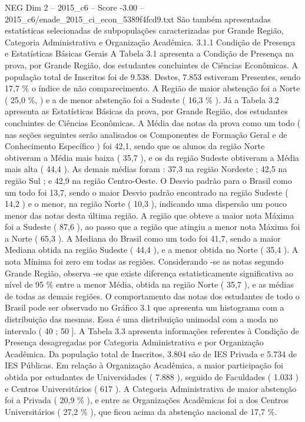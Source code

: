 \begin{textsample}{NEG Dim 2 – 2015\_c6 – Score -3.00 – 2015\_c6/enade\_2015\_ci\_econ\_5389f4fcd9.txt}
São também apresentadas estatísticas selecionadas de subpopulações caracterizadas por Grande Região, Categoria Administrativa e Organização Acadêmica. 3.1.1 Condição de Presença e Estatísticas Básicas Gerais A Tabela 3.1 apresenta a Condição de Presença na prova, por Grande Região, dos estudantes concluintes de Ciências Econômicas.
A população total de Inscritos foi de 9.538.
Destes, 7.853 estiveram Presentes, sendo 17,7 \% o índice de não comparecimento.
A Região de maior abstenção foi a Norte ( 25,0 \%, ) e a de menor abstenção foi a Sudeste ( 16,3 \% ).
Já a Tabela 3.2 apresenta as Estatísticas Básicas da prova, por Grande Região, dos estudantes concluintes de Ciências Econômicas.
A Média das notas da prova como um todo ( nas seções seguintes serão analisados os Componentes de Formação Geral e de Conhecimento Específico ) foi 42,1, sendo que os alunos da região Norte obtiveram a Média mais baixa ( 35,7 ), e os da região Sudeste obtiveram a Média mais alta ( 44,4 ).
As demais médias foram : 37,3 na região Nordeste ; 42,5 na região Sul ; e 42,9 na região Centro-Oeste.
O Desvio padrão para o Brasil como um todo foi 13,7, sendo o maior Desvio padrão encontrado na região Sudeste ( 14,2 ) e o menor, na região Norte ( 10,3 ), indicando uma dispersão um pouco menor das notas desta última região.
A região que obteve a maior nota Máxima foi a Sudeste ( 87,6 ), ao passo que a região que atingiu a menor nota Máxima foi a Norte ( 65,3 ).
A Mediana do Brasil como um todo foi 41,7, sendo a maior Mediana obtida na região Sudeste ( 44,4 ), e a menor obtida no Norte ( 35,4 ).
A nota Mínima foi zero em todas as regiões.
Considerando -se as notas segundo Grande Região, observa -se que existe diferença estatisticamente significativa ao nível de 95 \% entre a menor Média, obtida na região Norte ( 35,7 ), e as médias de todas as demais regiões.
O comportamento das notas dos estudantes de todo o Brasil pode ser observado no Gráfico 3.1 que apresenta um histograma com a distribuição das mesmas.
Essa é uma distribuição unimodal com a moda no intervalo ( 40 ; 50 ].
A Tabela 3.3 apresenta informações referentes à Condição de Presença desagregadas por Categoria Administrativa e por Organização Acadêmica.
Da população total de Inscritos, 3.804 são de IES Privada e 5.734 de IES Públicas.
Em relação à Organização Acadêmica, a maior participação foi obtida por estudantes de Universidades ( 7.888 ), seguido de Faculdades ( 1.033 ) e Centros Universitários ( 617 ).
A Categoria Administrativa de maior abstenção foi a Privada ( 20,9 \% ), e entre as Organizações Acadêmicas foi a dos Centros Universitários ( 27,2 \% ), que ficou acima da abstenção nacional de 17,7 \%.

\end{textsample}

